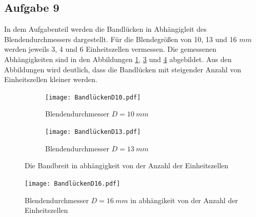 \subsection{Aufgabe 9}
In dem Aufgabenteil werden die Bandlücken in Abhängigleit des Blendendurchmessers dargestellt.
Für die Blendegrößen von 10, 13 und 16 $\si{mm}$ werden jeweils 3, 4 und 6 Einheitszellen vermessen.
Die gemessenen Abhängigkeiten sind in den Abbildungen \ref{fig.Aufgabe9}, \ref{fig.Aufgabe91} und \ref{fig.Aufgabe92} abgebildet.
Aus den Abbildungen wird deutlich, dass die Bandlücken mit steigender Anzahl von Einheitszellen kleiner werden.
  \begin{figure}
   \centering
   \begin{subfigure}{0.48\textwidth}
    \centering
    \texttt{[image: BandlückenD10.pdf]}
    \caption{Blendendurchmesser $D=\SI{10}{mm}$}
    \label{fig.Aufgabe9}
   \end{subfigure}
   \begin{subfigure}{0.48\textwidth}
    \centering
    \texttt{[image: BandlückenD13.pdf]}
    \caption{Blendendurchmesser $D=\SI{13}{mm}$}
    \label{fig.Aufgabe91}
   \end{subfigure}
   \caption{Die Bandbreit in abhängigkeit von der Anzahl der Einheitszellen}
  \end{figure}
  \begin{figure}[h!]
    \centering
    \texttt{[image: BandlückenD16.pdf]}
    \caption{Blendendurchmesser $D=\SI{16}{mm}$ in abhängikeit von der Anzahl der Einheitszellen}
    \label{fig.Aufgabe92}
  \end{figure}
  \FloatBarrier

